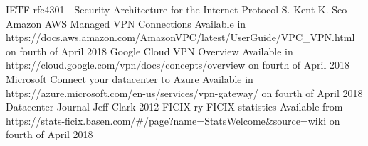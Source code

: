 \documentclass{article}
\begin{document}
\begin{thebibliography}{9}
	IETF
	rfc4301 - Security Architecture for the Internet Protocol
	S. Kent
	K. Seo
	Amazon
	AWS Managed VPN Connections
	Available in https://docs.aws.amazon.com/AmazonVPC/latest/UserGuide/VPC\_VPN.html on fourth of April 2018
	Google
	Cloud VPN Overview
	Available in https://cloud.google.com/vpn/docs/concepts/overview on fourth of April 2018
	Microsoft
	Connect your datacenter to Azure
	Available in https://azure.microsoft.com/en-us/services/vpn-gateway/ on fourth of April 2018
	Datacenter Journal
	Jeff Clark
	2012
	FICIX ry
	FICIX statistics
	Available from https://stats-ficix.basen.com/\#/page?name=StatsWelcome\&source=wiki on fourth of April 2018
\end{thebibliography}
\end{document}
